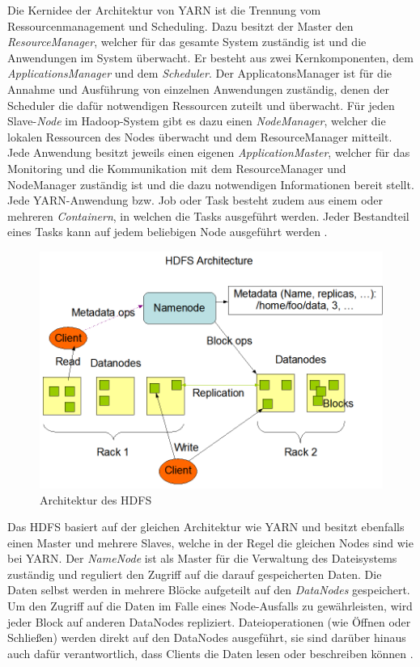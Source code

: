 Die Kernidee der Architektur von YARN ist die Trennung vom Ressourcenmanagement und Scheduling. Dazu besitzt der Master den \emph{ResourceManager}, welcher für das gesamte System zuständig ist und die Anwendungen im System überwacht. Er besteht aus zwei Kernkomponenten, dem \emph{ApplicationsManager} und dem \emph{Scheduler}. Der ApplicatonsManager ist für die Annahme und Ausführung von einzelnen Anwendungen zuständig, denen der Scheduler die dafür notwendigen Ressourcen zuteilt und überwacht. Für jeden Slave-\emph{Node} im Hadoop-System gibt es dazu einen \emph{NodeManager}, welcher die lokalen Ressourcen des Nodes überwacht und dem ResourceManager mitteilt. Jede Anwendung besitzt jeweils einen eigenen \emph{ApplicationMaster}, welcher für das Monitoring und die Kommunikation mit dem ResourceManager und NodeManager zuständig ist und die dazu notwendigen Informationen bereit stellt. Jede YARN-Anwendung bzw. Job oder Task besteht zudem aus einem oder mehreren \emph{Containern}, in welchen die Tasks ausgeführt werden. Jeder Bestandteil eines Tasks kann auf jedem beliebigen Node ausgeführt werden \cite{HadoopYarnDesc272}.

\begin{figure}
    \centering
    \includegraphics[width=\columnwidth]{./images/hdfsarchitecture.png}
    \caption[Architektur des HDFS]{Architektur des HDFS \cite{HadoopHdfsDesc272}}
    \label{fig:hdfsarch}
\end{figure}

Das HDFS basiert auf der gleichen Architektur wie YARN und besitzt ebenfalls einen Master und mehrere Slaves, welche in der Regel die gleichen Nodes sind wie bei YARN. Der \emph{NameNode} ist als Master für die Verwaltung des Dateisystems zuständig und reguliert den Zugriff auf die darauf gespeicherten Daten. Die Daten selbst werden in mehrere Blöcke aufgeteilt auf den \emph{DataNodes} gespeichert. Um den Zugriff auf die Daten im Falle eines Node-Ausfalls zu gewährleisten, wird jeder Block auf anderen DataNodes repliziert. Dateioperationen (wie Öffnen oder Schließen) werden direkt auf den DataNodes ausgeführt, sie sind darüber hinaus auch dafür verantwortlich, dass Clients die Daten lesen oder beschreiben können \cite{HadoopHdfsDesc272}.

